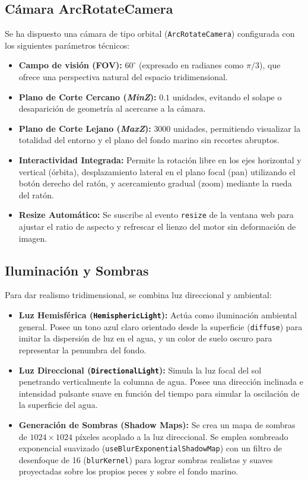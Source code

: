 \documentclass[12pt,a4paper]{article}
\begin{document}
\subsection{Cámara ArcRotateCamera}
Se ha dispuesto una cámara de tipo orbital (\texttt{ArcRotateCamera}) configurada con los siguientes parámetros técnicos:
\begin{itemize}
    \item \textbf{Campo de visión (FOV):} $60^\circ$ (expresado en radianes como $\pi/3$), que ofrece una perspectiva natural del espacio tridimensional.
    \item \textbf{Plano de Corte Cercano (\textit{MinZ}):} $0.1$ unidades, evitando el solape o desaparición de geometría al acercarse a la cámara.
    \item \textbf{Plano de Corte Lejano (\textit{MaxZ}):} $3000$ unidades, permitiendo visualizar la totalidad del entorno y el plano del fondo marino sin recortes abruptos.
    \item \textbf{Interactividad Integrada:} Permite la rotación libre en los ejes horizontal y vertical (órbita), desplazamiento lateral en el plano focal (pan) utilizando el botón derecho del ratón, y acercamiento gradual (zoom) mediante la rueda del ratón.
    \item \textbf{Resize Automático:} Se suscribe al evento \texttt{resize} de la ventana web para ajustar el ratio de aspecto y refrescar el lienzo del motor sin deformación de imagen.
\end{itemize}

\subsection{Iluminación y Sombras}
Para dar realismo tridimensional, se combina luz direccional y ambiental:
\begin{itemize}
    \item \textbf{Luz Hemisférica (\texttt{HemisphericLight}):} Actúa como iluminación ambiental general. Posee un tono azul claro orientado desde la superficie (\texttt{diffuse}) para imitar la dispersión de luz en el agua, y un color de suelo oscuro para representar la penumbra del fondo.
    \item \textbf{Luz Direccional (\texttt{DirectionalLight}):} Simula la luz focal del sol penetrando verticalmente la columna de agua. Posee una dirección inclinada e intensidad pulsante suave en función del tiempo para simular la oscilación de la superficie del agua.
    \item \textbf{Generación de Sombras (Shadow Maps):} Se crea un mapa de sombras de $1024 \times 1024$ píxeles acoplado a la luz direccional. Se emplea sombreado exponencial suavizado (\texttt{useBlurExponentialShadowMap}) con un filtro de desenfoque de 16 (\texttt{blurKernel}) para lograr sombras realistas y suaves proyectadas sobre los propios peces y sobre el fondo marino.
\end{itemize}
\end{document}
